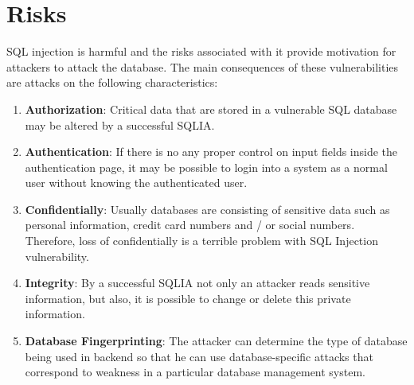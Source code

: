 \documentclass{article}
\begin{document}
\section*{Risks} 
\hspace*{10mm}SQL injection is harmful and the risks associated with it provide motivation for attackers to attack the database. The main consequences of these vulnerabilities are attacks on the following characteristics:
\begin{enumerate}
\item \textbf{Authorization}: Critical data that are stored in a vulnerable SQL database may be altered by a successful
SQLIA.
\item \textbf{Authentication}: If there is no any proper control on input fields inside the authentication page, it may be
possible to login into a system as a normal user without knowing the authenticated user.
\item \textbf{Confidentially}: Usually databases are consisting of sensitive data such as personal information, credit card
numbers and / or social numbers. Therefore, loss of confidentially is a terrible problem with SQL Injection
vulnerability.
\item \textbf{Integrity}: By a successful SQLIA not only an attacker reads sensitive information, but also, it is possible to
change or delete this private information.
\item \textbf{Database Fingerprinting}: The attacker can determine the type of database being used in backend so that he
can use database-specific attacks that correspond to weakness in a particular database management system.
\end{enumerate}

\end{document}
